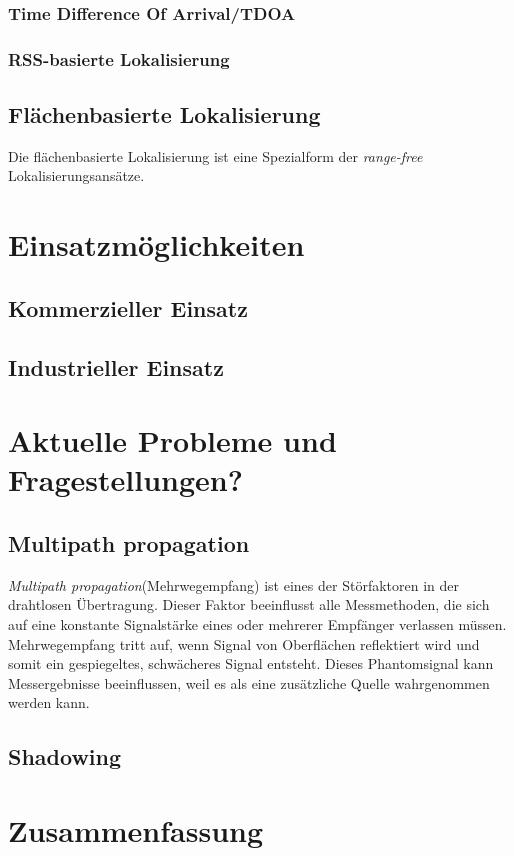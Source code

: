 \documentclass[12pt, a4wide]{scrreprt}
\begin{document}
    \subsection{Time Difference Of Arrival/TDOA}
    \subsection{RSS-basierte Lokalisierung}    
  \section{Flächenbasierte Lokalisierung}
Die flächenbasierte Lokalisierung ist eine Spezialform der \textit{range-free} Lokalisierungsansätze.
\chapter{Einsatzmöglichkeiten}
  \section{Kommerzieller Einsatz}
  \section{Industrieller Einsatz}

\chapter{Aktuelle Probleme und Fragestellungen?}
  \section{Multipath propagation}
\textit{Multipath propagation}(Mehrwegempfang) ist eines der Störfaktoren in der drahtlosen Übertragung. Dieser Faktor beeinflusst alle Messmethoden, die sich auf eine konstante Signalstärke eines oder mehrerer Empfänger verlassen müssen. Mehrwegempfang tritt auf, wenn Signal von Oberflächen reflektiert wird und somit ein gespiegeltes, schwächeres Signal entsteht. Dieses Phantomsignal kann Messergebnisse beeinflussen, weil es als eine zusätzliche Quelle wahrgenommen werden kann.
  \section{Shadowing}

\chapter{Zusammenfassung}

\newpage
\pagestyle{empty}
%

\begin{multicols}{2}

\nocite{*}
\end{multicols}
\end{document}
